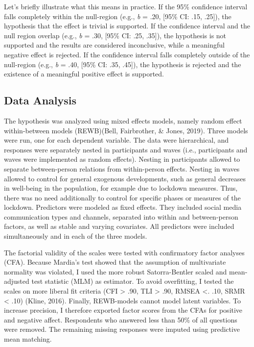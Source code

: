 \documentclass[
  english,
  man,floatsintext]{apa6}
\begin{document}
Let's briefly illustrate what this means in practice.
If the 95\% confidence interval falls completely within the null-region (e.g., \emph{b} = .20, {[}95\% CI: .15, .25{]}), the hypothesis that the effect is trivial is supported.
If the confidence interval and the null region overlap (e.g., \emph{b} = .30, {[}95\% CI: .25, .35{]}), the hypothesis is not supported and the results are considered inconclusive, while a meaningful negative effect is rejected.
If the confidence interval falls completely outside of the null-region (e.g., \emph{b} = .40, {[}95\% CI: .35, .45{]}), the hypothesis is rejected and the existence of a meaningful positive effect is supported.

\hypertarget{data-analysis}{%
\subsection{Data Analysis}\label{data-analysis}}

The hypothesis was analyzed using mixed effects models, namely random effect within-between models (REWB)(Bell, Fairbrother, \& Jones, 2019).
Three models were run, one for each dependent variable.
The data were hierarchical, and responses were separately nested in participants and waves (i.e., participants and waves were implemented as random effects).
Nesting in participants allowed to separate between-person relations from within-person effects.
Nesting in waves allowed to control for general exogenous developments, such as general decreases in well-being in the population, for example due to lockdown measures.
Thus, there was no need additionally to control for specific phases or measures of the lockdown.
Predictors were modeled as fixed effects.
They included social media communication types and channels, separated into within and between-person factors, as well as stable and varying covariates.
All predictors were included simultaneously and in each of the three models.

The factorial validity of the scales were tested with confirmatory factor analyses (CFA).
Because Mardia's test showed that the assumption of multivariate normality was violated, I used the more robust Satorra-Bentler scaled and mean-adjusted test statistic (MLM) as estimator.
To avoid overfitting, I tested the scales on more liberal fit criteria (CFI \textgreater{} .90, TLI \textgreater{} .90, RMSEA \textless. .10, SRMR \textless{} .10) (Kline, 2016).
Finally, REWB-models cannot model latent variables.
To increase precision, I therefore exported factor scores from the CFAs for positive and negative affect.
Respondents who answered less than 50\% of all questions were removed.
The remaining missing responses were imputed using predictive mean matching.
\end{document}
